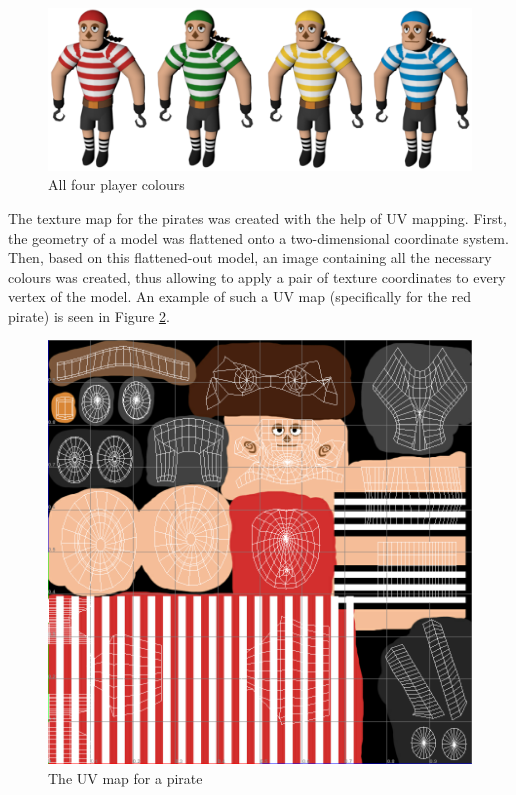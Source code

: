\begin{figure}[h!]
	\centering
	\includegraphics[width=\textwidth]{figures/pirate_rainbow.png}
	\caption{All four player colours \label{fig:pirate_rainbow}}
\end{figure}
The texture map for the pirates was created with the help of UV mapping. First, the geometry of a model was flattened onto a two-dimensional coordinate system. Then, based on this flattened-out model, an image containing all the necessary colours was created, thus allowing to apply a pair of texture coordinates to every vertex of the model. An example of such a UV map (specifically for the red pirate) is seen in Figure \ref{fig:uv_map}.

\begin{figure}[h!]
	\centering
	\includegraphics[width=\textwidth]{figures/uv_map.png}
	\caption{The UV map for a pirate \label{fig:uv_map}}
\end{figure}

